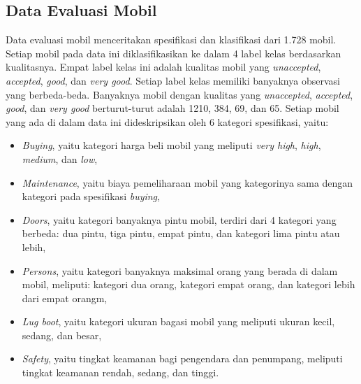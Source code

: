 \subsection{Data Evaluasi Mobil} \label{tentang car}
\noindent Data evaluasi mobil menceritakan spesifikasi dan klasifikasi dari 1.728 mobil. Setiap mobil pada data ini diklasifikasikan ke dalam 4 label kelas berdasarkan kualitasnya. Empat label kelas ini adalah kualitas mobil yang \emph{unaccepted}, \emph{accepted}, \emph{good}, dan \emph{very good}. Setiap label kelas memiliki banyaknya observasi yang berbeda-beda. Banyaknya mobil dengan kualitas yang \emph{unaccepted},  \emph{accepted}, \emph{good}, dan \emph{very good} berturut-turut adalah 1210, 384, 69, dan 65. Setiap mobil yang ada di dalam data ini dideskripsikan oleh 6 kategori spesifikasi, yaitu:
\begin{itemize}
    \item \emph{Buying}, yaitu kategori harga beli mobil yang meliputi \emph{very high}, \emph{high}, \emph{medium}, dan \emph{low},
    \item \emph{Maintenance}, yaitu biaya pemeliharaan mobil yang kategorinya sama dengan kategori pada spesifikasi \emph{buying},
    \item \emph{Doors}, yaitu kategori banyaknya pintu mobil, terdiri dari 4 kategori yang berbeda: dua pintu, tiga pintu, empat pintu, dan kategori lima pintu atau lebih,
    \item \emph{Persons}, yaitu kategori banyaknya maksimal orang yang berada di dalam mobil, meliputi: kategori dua orang, kategori empat orang, dan kategori lebih dari empat orangm,
    \item \emph{Lug boot}, yaitu kategori ukuran bagasi mobil yang meliputi ukuran kecil, sedang, dan besar,
    \item \emph{Safety}, yaitu tingkat keamanan bagi pengendara dan penumpang, meliputi tingkat keamanan rendah, sedang, dan tinggi.
\end{itemize}

